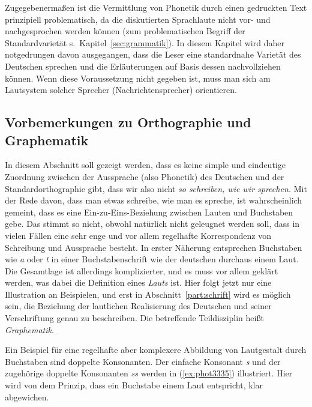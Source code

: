 Zugegebenermaßen ist die Vermittlung von Phonetik durch einen gedruckten Text prinzipiell problematisch, da die diskutierten Sprachlaute nicht vor- und nachgesprochen werden können (zum problematischen Begriff der Standardvarietät s.\ Kapitel~\ref{sec:grammatik}).
In diesem Kapitel wird daher notgedrungen davon ausgegangen, dass die Leser eine standardnahe Varietät des Deutschen sprechen und die Erläuterungen auf Basis dessen nachvollziehen können.
Wenn diese Voraussetzung nicht gegeben ist, muss man sich am Lautsystem solcher Sprecher (\zB Nachrichtensprecher) orientieren.

\subsection{Vorbemerkungen zu Orthographie und Graphematik}

\label{sec:schriftlaut}
\label{sec:unphonetischeschreibungen}


In diesem Abschnitt soll gezeigt werden, dass es keine simple und eindeutige Zuordnung zwischen der Aussprache (also Phonetik) des Deutschen und der Standardorthographie gibt, dass wir also nicht \textit{so schreiben, wie wir sprechen.}
Mit der Rede davon, dass man etwas schreibe, wie man es spreche, ist wahrscheinlich gemeint, dass es eine Ein-zu-Eins-Beziehung zwischen Lauten und Buchstaben gebe. 
Das stimmt so nicht, obwohl natürlich nicht geleugnet werden soll, dass in vielen Fällen eine sehr enge und vor allem regelhafte Korrespondenz von Schreibung und Aussprache besteht.
In erster Näherung entsprechen Buchstaben wie \textit{a} oder \textit{t} in einer Buchstabenschrift wie der deutschen durchaus einem Laut. 
Die Gesamtlage ist allerdings komplizierter, und es muss vor allem geklärt werden, was dabei die Definition eines \textit{Lauts} ist.  
Hier folgt jetzt nur eine Illustration an Beispielen, und erst in Abschnitt~\ref{part:schrift} wird es möglich sein, die Beziehung der lautlichen Realisierung des Deutschen und seiner Verschriftung genau zu beschreiben.
Die betreffende Teildisziplin heißt \textit{Graphematik}.

Ein Beispiel für eine regelhafte aber komplexere Abbildung von Lautgestalt durch Buchstaben sind doppelte Konsonanten.
Der einfache Konsonant \textit{s} und der zugehörige doppelte Konsonanten \textit{ss} werden in (\ref{ex:phot3335}) illustriert.
Hier wird von dem Prinzip, dass ein Buchstabe einem Laut entspricht, klar abgewichen.

